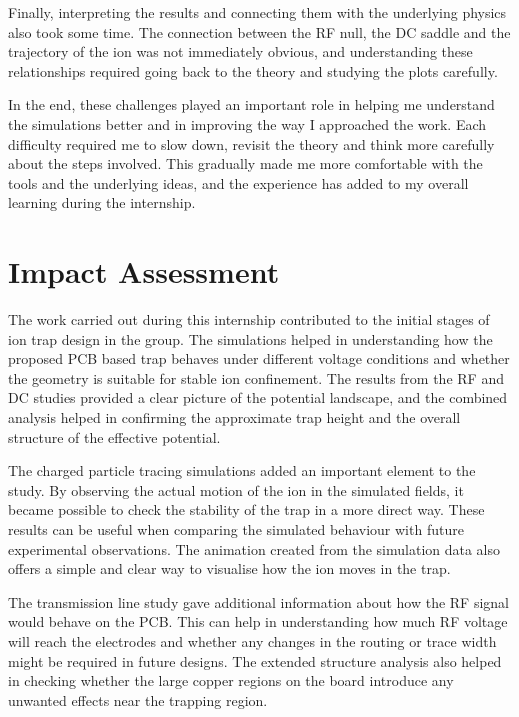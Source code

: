 \documentclass[12pt,a4paper]{report}
\begin{document}
Finally, interpreting the results and connecting them with the underlying physics also took some time. The connection between the RF null, the DC saddle and the trajectory of the ion was not immediately obvious, and understanding these relationships required going back to the theory and studying the plots carefully.

In the end, these challenges played an important role in helping me understand the simulations better and in improving the way I approached the work. Each difficulty required me to slow down, revisit the theory and think more carefully about the steps involved. This gradually made me more comfortable with the tools and the underlying ideas, and the experience has added to my overall learning during the internship.

\chapter*{Impact Assessment}

The work carried out during this internship contributed to the initial stages of ion trap design in the group. The simulations helped in understanding how the proposed PCB based trap behaves under different voltage conditions and whether the geometry is suitable for stable ion confinement. The results from the RF and DC studies provided a clear picture of the potential landscape, and the combined analysis helped in confirming the approximate trap height and the overall structure of the effective potential.

The charged particle tracing simulations added an important element to the study. By observing the actual motion of the ion in the simulated fields, it became possible to check the stability of the trap in a more direct way. These results can be useful when comparing the simulated behaviour with future experimental observations. The animation created from the simulation data also offers a simple and clear way to visualise how the ion moves in the trap.

The transmission line study gave additional information about how the RF signal would behave on the PCB. This can help in understanding how much RF voltage will reach the electrodes and whether any changes in the routing or trace width might be required in future designs. The extended structure analysis also helped in checking whether the large copper regions on the board introduce any unwanted effects near the trapping region.
\end{document}
